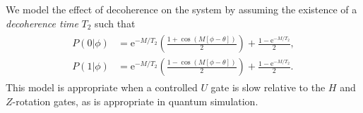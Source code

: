 \documentclass[aps,pra,amsmath,twocolumn,amssymb,superscriptaddress]{revtex4-1}
\newcommand{\ee}{\mathrm{e}}
\begin{document}
We model the effect of decoherence on the system by assuming the existence of a \emph{decoherence time} $T_2$ such that
\begin{gather}
    \label{eq:likedecohere}
    \begin{aligned}
        P(0|\phi) & = \ee^{-M/T_2}\left(\frac{1+\cos(M[\phi -\theta])}{2}\right)+\frac{1-\ee^{-M/T_2}}{2},\\
        P(1|\phi) & = \ee^{-M/T_2}\left(\frac{1-\cos(M[\phi -\theta])}{2}\right)+\frac{1-\ee^{-M/T_2}}{2}.
    \end{aligned}
\end{gather}
This model is appropriate when a controlled $U$ gate is slow relative to the $H$ and $Z$-rotation gates, as is appropriate in quantum simulation.  %
 
\end{document}
